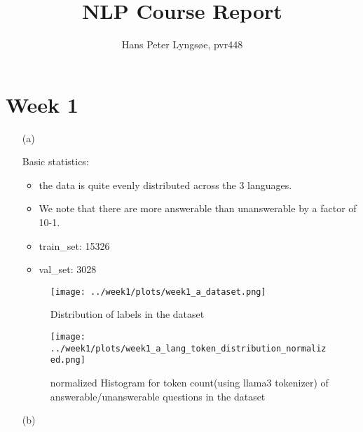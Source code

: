 \documentclass{article}
\begin{document}
\title{NLP Course Report}
\author{Hans Peter Lyngsøe, pvr448}

\maketitle

\section{Week 1}
\begin{enumerate}
    \item[(a)] 

    Basic statistics:
    \begin{itemize}
        \item the data is quite evenly distributed across the 3 languages.
        \item We note that there are more answerable than unanswerable by a factor of 10-1.
        \item train\_set: 15326
        \item val\_set: 3028
    \end{itemize}

    \begin{figure}[h]
        \centering
        \texttt{[image: ../week1/plots/week1\_a\_dataset.png]}
        \caption{Distribution of labels in the dataset}
        \label{fig:label_distribution}
    \end{figure}

    \begin{figure}[h]
        \centering
        \texttt{[image: ../week1/plots/week1\_a\_lang\_token\_distribution\_normalized.png]}
        \caption{normalized Histogram for token count(using llama3 tokenizer) of answerable/unanswerable questions in the dataset}
        \label{fig:language_distribution}
    \end{figure}

    \item[(b)] 


\end{enumerate}
\end{document}
